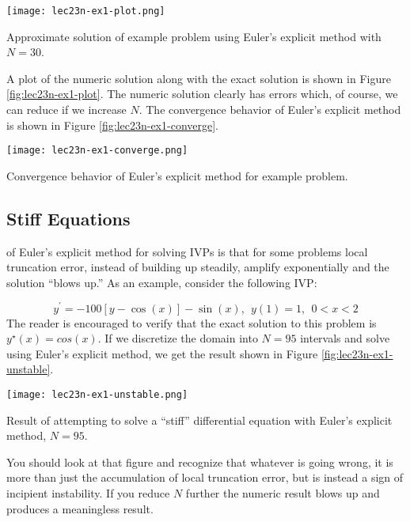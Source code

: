 \begin{marginfigure}[-5.0cm]
\texttt{[image: lec23n-ex1-plot.png]}
\caption{Approximate solution of example problem using Euler's explicit method with $N=30$.}
\label{fig:lec23n-ex1-plot}
\end{marginfigure}
A plot of the numeric solution along with the exact solution is shown in Figure \ref{fig:lec23n-ex1-plot}. The numeric solution clearly has errors which, of course, we can reduce if we increase $N$.  The convergence behavior of Euler's explicit method is shown in Figure \ref{fig:lec23n-ex1-converge}.
\begin{marginfigure}[-0.20cm]
\texttt{[image: lec23n-ex1-converge.png]}
\caption{Convergence behavior of Euler's explicit method for example problem.}
\label{fig:lec23n-ex1-converge}
\end{marginfigure}

\vspace{2.0cm}

\subsection{Stiff Equations}

 of Euler's explicit method for solving IVPs is that for some problems local truncation error, instead of building up steadily, amplify exponentially and the solution ``blows up.''  As an example, consider the following IVP:

\begin{equation}
y^{\prime} = -100[y-\cos{(x)}]- \sin{(x)}, \ \ y(1) = 1, \ \ 0<x<2
\label{eq:lec23n-stiff-ivp}
\end{equation}
The reader is encouraged to verify that the exact solution to this problem is $y^{\star}(x)=cos{(x)}$.  If we discretize the domain into $N=95$ intervals and solve using Euler's explicit method, we get the result shown in Figure \ref{fig:lec23n-ex1-unstable}.
\begin{marginfigure}
\texttt{[image: lec23n-ex1-unstable.png]}
\caption{Result of attempting to solve a ``stiff'' differential equation with Euler's explicit method, $N=95$.}
\label{fig:lec23n-ex1-unstable}
\end{marginfigure}
You should look at that figure and recognize that whatever is going wrong, it is more than just the accumulation of local truncation error, but is instead a sign of incipient instability.  If you reduce $N$ further the numeric result blows up and produces a meaningless result.

